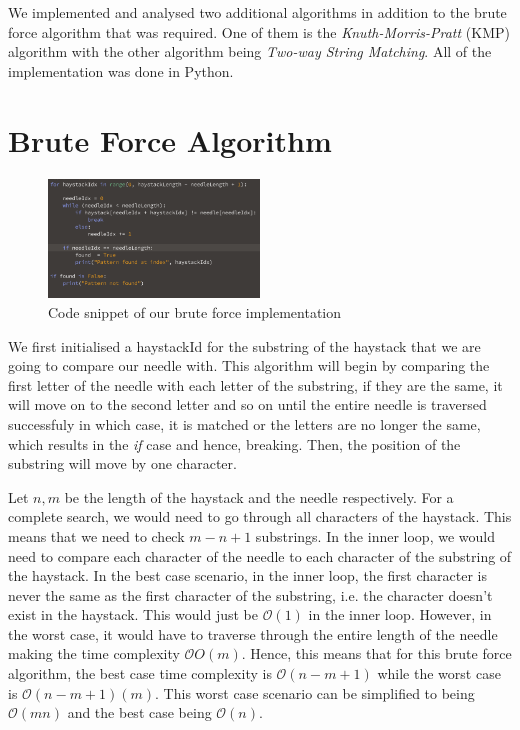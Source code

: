 
We implemented and analysed two additional algorithms in addition to the brute force algorithm that was required. One of them is the \emph{Knuth-Morris-Pratt} (KMP) algorithm with the other algorithm being \emph{Two-way String Matching}. All of the implementation was done in Python.

\section*{Brute Force Algorithm}
\begin{figure}[h!]
    \centering
    \includegraphics[width=0.50\textwidth]{images/brute_force.png}
    \caption{Code snippet of our brute force implementation}
\end{figure}

We first initialised a haystackId for the substring of the haystack that we are going to compare our needle with. This algorithm will begin by comparing the first letter of the needle with each letter of the substring, if they are the same, it will move on to the second letter and so on until the entire needle is traversed successfuly in which case, it is matched or the letters are no longer the same, which results in the \emph{if} case and hence, breaking. Then, the position of the substring will move by one character. 

Let $n, m$ be the length of the haystack and the needle respectively. For a complete search, we would need to go through all characters of the haystack. This means that we need to check $m - n + 1$ substrings. In the inner loop, we would need to compare each character of the needle to each character of the substring of the haystack. In the best case scenario, in the inner loop, the first character is never the same as the first character of the substring, i.e. the character doesn't exist in the haystack. This would just be $\mathcal{O}(1)$ in the inner loop. However, in the worst case, it would have to traverse through the entire length of the needle making the time complexity $\mathcal{O}O(m)$. Hence, this means that for this brute force algorithm, the best case time complexity is $\mathcal{O}(n - m + 1)$ while the worst case is $\mathcal{O}(n - m + 1)(m)$. This worst case scenario can be simplified to being $\mathcal{O}(mn)$ and the best case being $\mathcal{O}(n)$.

